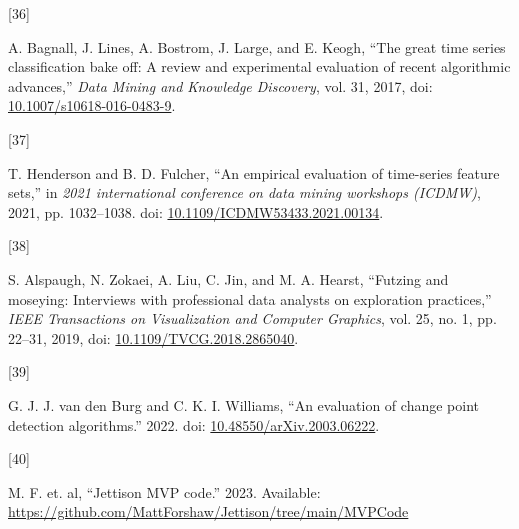 \documentclass{article}
\newlength{\cslhangindent}
\newlength{\csllabelwidth}
\newlength{\cslentryspacingunit} %
\newenvironment{CSLReferences}[2] %
 {%
  \setlength{\parindent}{0pt}
  \ifodd #1
  \let\oldpar\par
  \def\par{\hangindent=\cslhangindent\oldpar}
  \fi
  \setlength{\parskip}{#2\cslentryspacingunit}
 }%
 {}
\newcommand{\CSLLeftMargin}[1]{\parbox[t]{\csllabelwidth}{#1}}
\newcommand{\CSLRightInline}[1]{\parbox[t]{\linewidth - \csllabelwidth}{#1}\break}
\begin{document}
\begin{CSLReferences}{0}{0}
\leavevmode{}%
\CSLLeftMargin{{[}36{]} }
\CSLRightInline{A. Bagnall, J. Lines, A. Bostrom, J. Large, and E.
Keogh, {``The great time series classification bake off: A review and
experimental evaluation of recent algorithmic advances,''} \emph{Data
Mining and Knowledge Discovery}, vol. 31, 2017, doi:
\href{https://doi.org/10.1007/s10618-016-0483-9}{10.1007/s10618-016-0483-9}.}

\leavevmode{}%
\CSLLeftMargin{{[}37{]} }
\CSLRightInline{T. Henderson and B. D. Fulcher, {``An empirical
evaluation of time-series feature sets,''} in \emph{2021 international
conference on data mining workshops (ICDMW)}, 2021, pp. 1032--1038. doi:
\href{https://doi.org/10.1109/ICDMW53433.2021.00134}{10.1109/ICDMW53433.2021.00134}.}

\leavevmode{}%
\CSLLeftMargin{{[}38{]} }
\CSLRightInline{S. Alspaugh, N. Zokaei, A. Liu, C. Jin, and M. A.
Hearst, {``Futzing and moseying: Interviews with professional data
analysts on exploration practices,''} \emph{IEEE Transactions on
Visualization and Computer Graphics}, vol. 25, no. 1, pp. 22--31, 2019,
doi:
\href{https://doi.org/10.1109/TVCG.2018.2865040}{10.1109/TVCG.2018.2865040}.}

\leavevmode{}%
\CSLLeftMargin{{[}39{]} }
\CSLRightInline{G. J. J. van den Burg and C. K. I. Williams, {``An
evaluation of change point detection algorithms.''} 2022. doi:
\href{https://doi.org/10.48550/arXiv.2003.06222}{10.48550/arXiv.2003.06222}.}

\leavevmode{}%
\CSLLeftMargin{{[}40{]} }
\CSLRightInline{M. F. et. al, {``Jettison MVP code.''} 2023. Available:
\url{https://github.com/MattForshaw/Jettison/tree/main/MVPCode}}

\end{CSLReferences}



\end{document}
